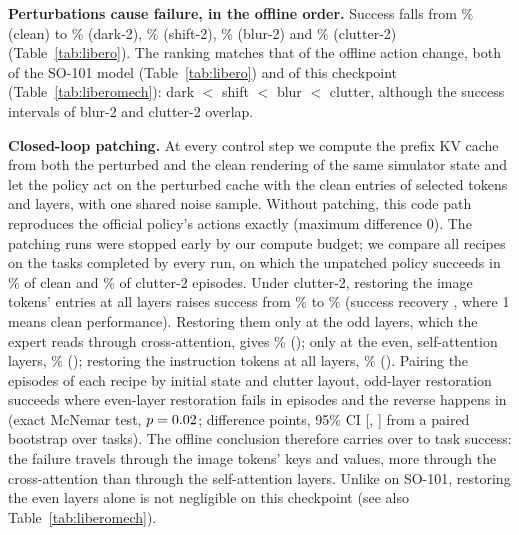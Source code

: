 \documentclass[conference]{IEEEtran}
\begin{document}
\textbf{Perturbations cause failure, in the offline order.} Success falls from \LbClean\% (clean) to \LbDark\% (dark-2), \LbShift\% (shift-2), \LbBlur\% (blur-2) and \LbClutter\% (clutter-2) (Table~\ref{tab:libero}). The ranking matches that of the offline action change, both of the SO-101 model (Table~\ref{tab:libero}) and of this checkpoint (Table~\ref{tab:liberomech}): dark $<$ shift $<$ blur $<$ clutter, although the success intervals of blur-2 and clutter-2 overlap.

\textbf{Closed-loop patching.} At every control step we compute the prefix KV cache from both the perturbed and the clean rendering of the same simulator state and let the policy act on the perturbed cache with the clean entries of selected tokens and layers, with one shared noise sample. Without patching, this code path reproduces the official policy's actions exactly (maximum difference 0). The patching runs were stopped early by our compute budget; we compare all recipes on the \PTasks{} tasks completed by every run, on which the unpatched policy succeeds in \PClean\% of clean and \PClutter\% of clutter-2 episodes. Under clutter-2, restoring the image tokens' entries at all layers raises success from \PClutter\% to \PImg\% (success recovery \PImgRec{}, where 1 means clean performance). Restoring them only at the odd layers, which the expert reads through cross-attention, gives \POdd\% (\POddRec{}); only at the even, self-attention layers, \PEven\% (\PEvenRec{}); restoring the instruction tokens at all layers, \PText\% (\PTextRec{}). Pairing the \OePairs{} episodes of each recipe by initial state and clutter layout, odd-layer restoration succeeds where even-layer restoration fails in \OeOddOnly{} episodes and the reverse happens in \OeEvenOnly{} (exact McNemar test, $p = 0.02$; difference \OeDiff{} points, 95\% CI [\OeDiffLo, \OeDiffHi] from a paired bootstrap over tasks). The offline conclusion therefore carries over to task success: the failure travels through the image tokens' keys and values, more through the cross-attention than through the self-attention layers. Unlike on SO-101, restoring the even layers alone is not negligible on this checkpoint (see also Table~\ref{tab:liberomech}).
\end{document}
